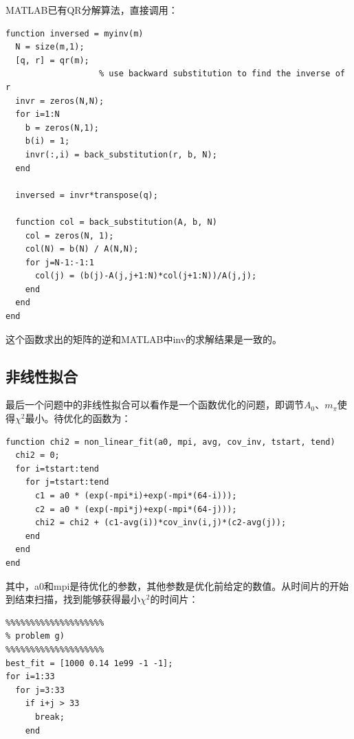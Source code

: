 \documentclass[paper=a4, fontsize=11pt]{scrartcl} %
\numberwithin{equation}{section} %
\numberwithin{figure}{section} %
\numberwithin{table}{section} %
\begin{document}
\begin{CJK*}{UTF8}{gbsn}
MATLAB已有QR分解算法，直接调用：
\begin{lstlisting}
function inversed = myinv(m)
  N = size(m,1);
  [q, r] = qr(m);
                   % use backward substitution to find the inverse of r
  invr = zeros(N,N);
  for i=1:N
    b = zeros(N,1);
    b(i) = 1;
    invr(:,i) = back_substitution(r, b, N);
  end

  inversed = invr*transpose(q);

  function col = back_substitution(A, b, N)
    col = zeros(N, 1);
    col(N) = b(N) / A(N,N);
    for j=N-1:-1:1
      col(j) = (b(j)-A(j,j+1:N)*col(j+1:N))/A(j,j);
    end
  end
end
\end{lstlisting}
这个函数求出的矩阵的逆和MATLAB中inv的求解结果是一致的。

\subsection{非线性拟合}
最后一个问题中的非线性拟合可以看作是一个函数优化的问题，即调节$A_0$、$m_\pi$使得$\chi^2$最小。待优化的函数为：
\begin{lstlisting}
function chi2 = non_linear_fit(a0, mpi, avg, cov_inv, tstart, tend)
  chi2 = 0;
  for i=tstart:tend
    for j=tstart:tend
      c1 = a0 * (exp(-mpi*i)+exp(-mpi*(64-i)));
      c2 = a0 * (exp(-mpi*j)+exp(-mpi*(64-j)));
      chi2 = chi2 + (c1-avg(i))*cov_inv(i,j)*(c2-avg(j));
    end
  end
end
\end{lstlisting}
其中，a0和mpi是待优化的参数，其他参数是优化前给定的数值。从时间片的开始到结束扫描，找到能够获得最小$\chi^2$的时间片：
\begin{lstlisting}
%%%%%%%%%%%%%%%%%%%%
% problem g)
%%%%%%%%%%%%%%%%%%%%
best_fit = [1000 0.14 1e99 -1 -1];
for i=1:33
  for j=3:33
    if i+j > 33
      break;
    end


\end{lstlisting}
\end{CJK*}
\end{document}
